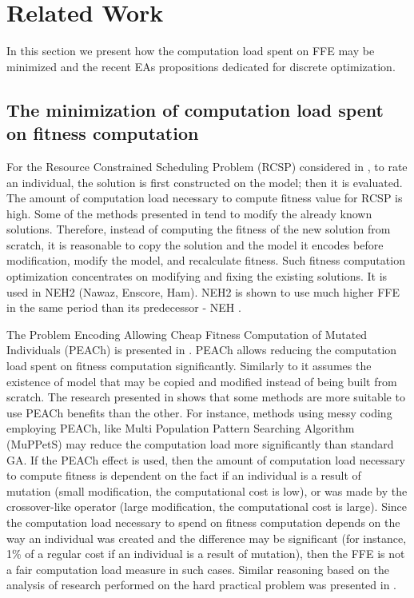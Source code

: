 \section{Related Work}
\label{sec:RelatedWork}
In this section we present how the computation load spent on FFE may be minimized and the recent EAs propositions dedicated for discrete optimization.

\subsection{The minimization of computation load spent on fitness computation}
For the Resource Constrained Scheduling Problem (RCSP) considered in \cite{Myszkowski2015}, to rate an individual, the solution is first constructed on the model; then it is evaluated. The amount of computation load necessary to compute fitness value for RCSP is high. Some of the methods presented in \cite{Myszkowski2015} tend to modify the already known solutions. Therefore, instead of computing the fitness of the new solution from scratch, it is reasonable to copy the solution and the model it encodes before modification, modify the model, and recalculate fitness. Such fitness computation optimization concentrates on modifying and fixing the existing solutions. It is used in NEH2 (Nawaz, Enscore, Ham). NEH2 is shown to use much higher FFE in the same period than its predecessor - NEH \cite{Myszkowski2015}. \par

The Problem Encoding Allowing Cheap Fitness Computation of Mutated Individuals (PEACh) is presented in \cite{PEACh}. PEACh allows reducing the computation load spent on fitness computation significantly. Similarly to \cite{Myszkowski2015} it assumes the existence of model that may be copied and modified instead of being built from scratch. The research presented in \cite{PEACh} shows that some methods are more suitable to use PEACh benefits than the other. For instance, methods using messy coding employing PEACh, like Multi Population Pattern Searching Algorithm (MuPPetS) \cite{MuPPetS} may reduce the computation load more significantly than standard GA. If the PEACh effect is used, then the amount of computation load necessary to compute fitness is dependent on the fact if an individual is a result of mutation (small modification, the computational cost is low), or was made by the crossover-like operator (large modification, the computational cost is large). Since the computation load necessary to spend on fitness computation depends on the way an individual was created and the difference may be significant (for instance, 1\% of a regular cost if an individual is a result of mutation), then the FFE is not a fair computation load measure in such cases. Similar reasoning based on the analysis of research performed on the hard practical problem was presented in \cite{MuPPetSeon}. \par

